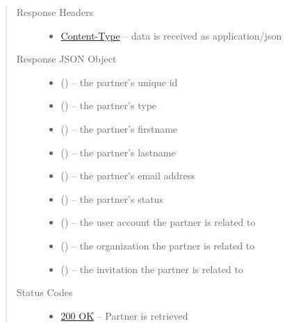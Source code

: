 \documentclass[letterpaper,10pt,english]{sphinxmanual}
\begin{document}
\begin{fulllineitems}
\begin{quote}
\begin{description}
\begin{itemize}
\end{itemize}

\item[{Response Headers}] \leavevmode\begin{itemize}
\item {} 
\href{http://tools.ietf.org/html/rfc7231\#section-3.1.1.5}{Content-Type} -- data is received as application/json

\end{itemize}

\item[{Response JSON Object}] \leavevmode\begin{itemize}
\item {} 
 () -- the partner's unique id

\item {} 
 () -- the partner's type

\item {} 
 () -- the partner's firstname

\item {} 
 () -- the partner's lastname

\item {} 
 () -- the partner's email address

\item {} 
 () -- the partner's status

\item {} 
 () -- the user account the partner is related to

\item {} 
 () -- the organization the partner is related to

\item {} 
 () -- the invitation the partner is related to

\end{itemize}

\item[{Status Codes}] \leavevmode\begin{itemize}
\item {} 
\href{http://www.w3.org/Protocols/rfc2616/rfc2616-sec10.html\#sec10.2.1}{200 OK} -- Partner is retrieved


\end{itemize}
\end{description}
\end{quote}
\end{fulllineitems}
\end{document}
